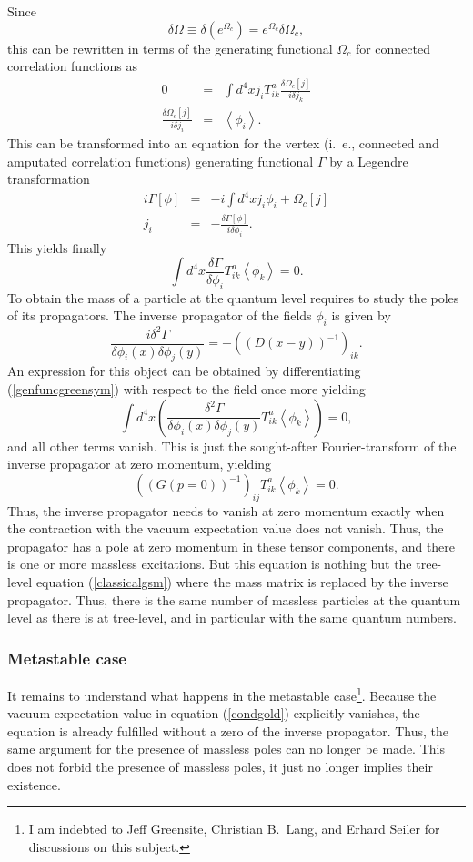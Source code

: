 \documentclass[final,12pt]{article}
\newcommand*{\no}{\noindent}
\newcommand*{\bea}{\begin{eqnarray}}
\newcommand*{\eea}{\end{eqnarray}}
\newcommand*{\be}{\begin{equation}}
\newcommand*{\ee}{\end{equation}}
\newcommand*{\pref}[1]{(\ref{#1})}
\newcommand*{\nn}{\nonumber}
\newcommand*{\1}{1\!\!\!\bot}
\newcommand*{\la}{\left\langle}
\newcommand*{\ra}{\right\rangle}
\begin{document}
Since
\be
\delta \Omega\equiv\delta\left(e^{\Omega_c}\right)=e^{\Omega_c}\delta \Omega_c\nn,
\ee
\no this can be rewritten in terms of the generating functional $\Omega_c$ for connected correlation functions as
\bea
0&=&\int d^4x j_i T_{ik}^a\frac{\delta \Omega_c[j]}{i\delta j_k}\nn\\
\frac{\delta \Omega_c[j]}{i\delta j_i}&=&\la\phi_i\ra\nn.
\eea
\no This can be transformed into an equation for the vertex (i.\ e., connected and amputated correlation functions) generating functional $\Gamma$ by a Legendre transformation
\bea
i\Gamma[\phi]&=&-i\int d^4 x j_i\phi_i+\Omega_c[j]\nn\\
j_i&=&-\frac{\delta\Gamma[\phi]}{i\delta\phi_i}\label{legendre}.
\eea
\no This yields finally
\be
\int d^4x\frac{\delta\Gamma}{\delta\phi_i} T_{ik}^a\la\phi_k\ra=0\label{genfuncgreensym}.
\ee
\no To obtain the mass of a particle at the quantum level requires to study the poles of its propagators. The inverse propagator of the fields $\phi_i$ is given by
\be
\frac{i\delta^2\Gamma}{\delta\phi_i(x)\delta\phi_j(y)}=-((D(x-y))^{-1})_{ik}.
\ee
\no An expression for this object can be obtained by differentiating \pref{genfuncgreensym} with respect to the field once more yielding \cite{Bohm:2001yx}
\be
\int d^4x\left(\frac{\delta^2\Gamma}{\delta\phi_i(x)\delta\phi_j(y)}T_{ik}^a\la\phi_k\ra\right)=0\nn,
\ee
\no and all other terms vanish. This is just the sought-after Fourier-transform of the inverse propagator at zero momentum, yielding
\be
((G(p=0))^{-1})_{ij}T_{ik}^a\la\phi_k\ra=0\label{condgold}.
\ee
\no Thus, the inverse propagator needs to vanish at zero momentum exactly when the contraction with the vacuum expectation value does not vanish. Thus, the propagator has a pole at zero momentum in these tensor components, and there is one or more massless excitations. But this equation is nothing but the tree-level equation \pref{classicalgsm} where the mass matrix is replaced by the inverse propagator. Thus, there is the same number of massless particles at the quantum level as there is at tree-level, and in particular with the same quantum numbers.

\subsubsection{Metastable case}

It remains to understand what happens in the metastable case\footnote{I am indebted to Jeff Greensite, Christian B.\ Lang, and Erhard Seiler for discussions on this subject.}. Because the vacuum expectation value in equation \pref{condgold} explicitly vanishes, the equation is already fulfilled without a zero of the inverse propagator. Thus, the same argument for the presence of massless poles can no longer be made. This does not forbid the presence of massless poles, it just no longer implies their existence.
\end{document}
